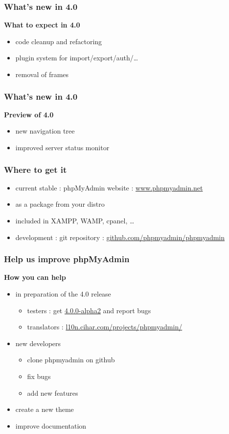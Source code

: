 \documentclass[14pt]{beamer}
\begin{document}
  \begin{frame}
    \frametitle{What's new in 4.0}
    \textbf{{\color{PmaOlive}What to expect in 4.0}}
    \pause
    \begin{itemize}[<+->]
      \item code cleanup and refactoring
      \item plugin system for import/export/auth/\ldots
      \item removal of frames
    \end{itemize}
  \end{frame}
  \begin{frame}
    \frametitle{What's new in 4.0}
    \textbf{{\color{PmaOlive}Preview of 4.0}}
     \begin{itemize}
      \item new navigation tree
      \item improved server status monitor
    \end{itemize}
  \end{frame}
  \begin{frame}
    \frametitle{Where to get it}
    \begin{itemize}[<+->]
      \item current stable : phpMyAdmin website : \href{http://www.phpmyadmin.net/}{www.phpmyadmin.net}
      \item as a package from your distro
      \item included in XAMPP, WAMP, cpanel, \ldots
      \item development : git repository :  \href{https://github.com/phpmyadmin/phpmyadmin}{github.com/phpmyadmin/phpmyadmin}
    \end{itemize}
  \end{frame}
  \begin{frame}
  \frametitle{Help us improve phpMyAdmin}
    \textbf{{\color{PmaOlive}How you can help}}
    \pause
    \begin{itemize}[<+->]
      \item in preparation of the 4.0 release
        \begin{itemize}[<+->]
	  \item testers : get \href{http://www.phpmyadmin.net/}{4.0.0-alpha2} and report bugs
	  \item translators : \href{https://l10n.cihar.com/projects/phpmyadmin/}{l10n.cihar.com/projects/phpmyadmin/}
	\end{itemize}
      \item new developers
	\begin{itemize}[<+->]
          \item clone phpmyadmin on github
          \item fix bugs
          \item add new features
	\end{itemize}
      \item create a new theme
      \item improve documentation
    \end{itemize}
  \end{frame}
\end{document}

